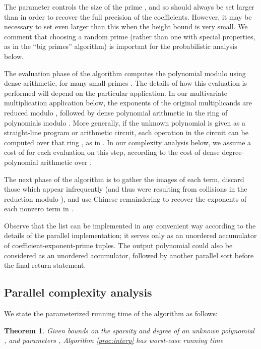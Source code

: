 \documentclass[letterpaper,10pt]{article}
\def\cite{\citep}
\newtheorem{theorem}{Theorem}
\begin{document}
The parameter  controls the size of the prime , and so should
always be set larger than  in order to recover the full precision of
the coefficients. However, it may be necessary to set  even larger
than this when the height bound  is very small. We comment that
choosing a random prime  (rather than one with special properties, as
in the ``big primes'' algorithm) is important for the probabilistic
analysis below.

The evaluation phase of the algorithm computes the polynomial
 modulo  using
dense arithmetic, for many small primes . The details of 
how this evaluation is performed
will depend on the particular application. In our
multivariate multiplication application below, the exponents of the
original multiplicands are reduced modulo , followed by dense
polynomial arithmetic in the ring of polynomials modulo . More
generally, if the unknown polynomial  is given as a straight-line
program or arithmetic circuit, each operation in the circuit can be
computed over that ring , as in
\cite{GS09}. In our complexity analysis below, we assume a cost of
 for each evaluation on
this step, according to the cost of dense
degree- polynomial arithmetic over .

The next phase of the algorithm is to gather the images of each term,
discard those which appear infrequently (and thus were resulting from
collisions in the reduction modulo ), and use Chinese
remaindering to recover the exponents of each nonzero term in .

Observe that the list  can be implemented in any convenient way
according to the details of the parallel implementation; it serves only
as an unordered accumulator of coefficient-exponent-prime tuples.
The output polynomial  could also be considered as an unordered
accumulator, followed by another parallel sort before the final return
statement.

\subsection{Parallel complexity analysis}

We state the parameterized running time of the algorithm as follows:

\begin{theorem}\label{thm:rtime}
  Given bounds  on the sparsity and degree of an unknown
  polynomial , and parameters ,
  Algorithm \ref{proc:interp} has worst-case running time
  
\end{theorem}
\end{document}
